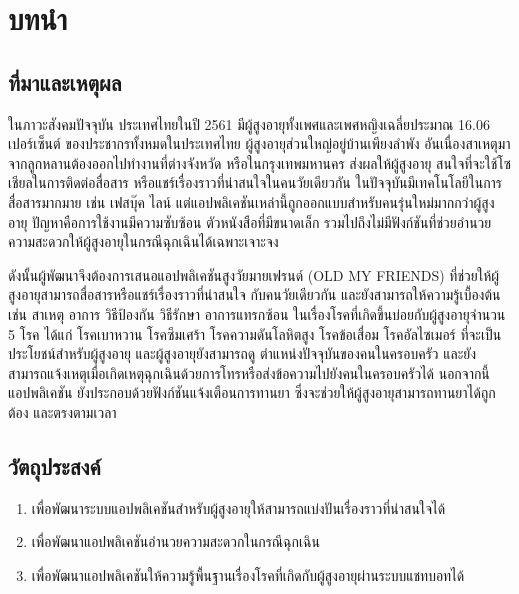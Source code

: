 \chapter{บทนำ}

\section{ที่มาและเหตุผล }
ในภาวะสังคมปัจจุบัน ประเทศไทยในปี 2561 มีผู้สูงอายุทั้งเพศและเพศหญิงเฉลี่ยประมาณ 16.06 เปอร์เซ็นต์ ของประชากรทั้งหมดในประเทศไทย
ผู้สูงอายุส่วนใหญ่อยู่บ้านเพียงลำพัง อันเนื่องสาเหตุมาจากลูกหลานต้องออกไปทำงานที่ต่างจังหวัด หรือในกรุงเทพมหานคร ส่งผลให้ผู้สูงอายุ
สนใจที่จะใช้โซเชียลในการติดต่อสื่อสาร หรือแชร์เรื่องราวที่น่าสนใจในคนวัยเดียวกัน ในปัจจุบันมีเทคโนโลยีในการสื่อสารมากมาย เช่น เฟสบุ๊ค ไลน์
แต่แอปพลิเคชันเหล่านี้ถูกออกแบบสำหรับคนรุ่นใหม่มากกว่าผู้สูงอายุ ปัญหาคือการใช้งานมีความซับซ้อน ตัวหนังสือที่มีขนาดเล็ก 
รวมไปถึงไม่มีฟังก์ชันที่ช่วยอำนวยความสะดวกให้ผู้สูงอายุในกรณีฉุกเฉินได้เฉพาะเจาะจง

ดังนั้นผู้พัฒนาจึงต้องการเสนอแอปพลิเคชันสูงวัยมายเฟรนด์ (OLD MY FRIENDS) ที่ช่วยให้ผู้สูงอายุสามารถสื่อสารหรือแชร์เรื่องราวที่น่าสนใจ
กับคนวัยเดียวกัน และยังสามารถให้ความรู้เบื้องต้น เช่น สาเหตุ อาการ วิธีป้องกัน วิธีรักษา อาการแทรกซ้อน ในเรื่องโรคที่เกิดขึ้นบ่อยกับผู้สูงอายุจำนวน 5 โรค ได้แก่ 
โรคเบาหวาน โรคซึมเศร้า โรคความดันโลหิตสูง โรคข้อเสื่อม โรคอัลไซเมอร์ ที่จะเป็นประโยชน์สำหรับผู้สูงอายุ และผู้สูงอายุยังสามารถดู
ตำแหน่งปัจจุบันของคนในครอบครัว และยังสามารถแจ้งเหตุเมื่อเกิดเหตุฉุกเฉินด้วยการโทรหรือส่งข้อความไปยังคนในครอบครัวได้ นอกจากนี้
แอปพลิเคชัน ยังประกอบด้วยฟังก์ชันแจ้งเตือนการทานยา ซึ่งจะช่วยให้ผู้สูงอายุสามารถทานยาได้ถูกต้อง และตรงตามเวลา

\section{วัตถุประสงค์}
\begin{enumerate}
	\item เพื่อพัฒนาระบบแอปพลิเคชันสำหรับผู้สูงอายุให้สามารถแบ่งปันเรื่องราวที่น่าสนใจได้
	\item เพื่อพัฒนาแอปพลิเคชันอำนวยความสะดวกในกรณีฉุกเฉิน
	\item เพื่อพัฒนาแอปพลิเคชันให้ความรู้พื้นฐานเรื่องโรคที่เกิดกับผู้สูงอายุผ่านระบบแชทบอทได้
\end{enumerate}
